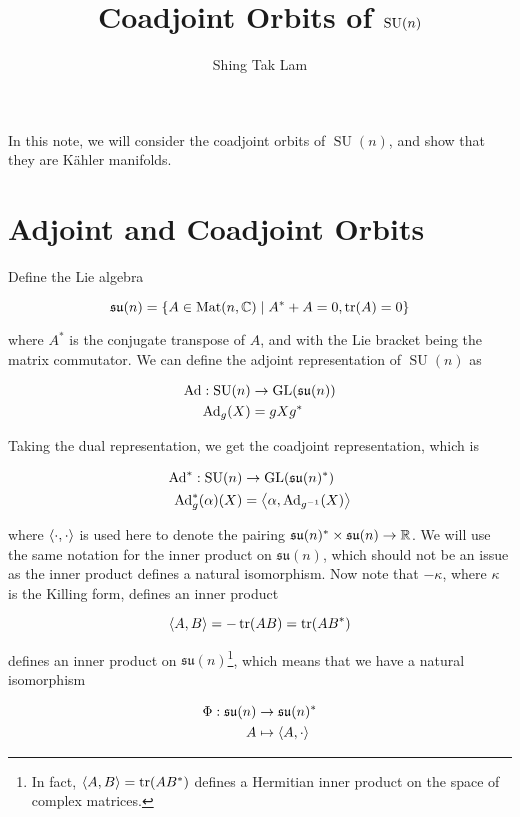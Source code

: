 \documentclass{article}
\title{Coadjoint Orbits of \(\SU(n)\)}
\author{Shing Tak Lam}
\DeclareMathOperator{\SU}{SU}
\newcommand{\su}{\mathfrak{su}}
\begin{document}
\maketitle

In this note, we will consider the coadjoint orbits of \(\SU(n)\), and show that they are K\"ahler manifolds.

\tableofcontents

\section{Adjoint and Coadjoint Orbits}

Define the Lie algebra

\[\su(n) = \left\{A \in \Mat(n, \C) \mid A^* + A = 0, \tr(A) = 0\right\}\]

where \(A^*\) is the conjugate transpose of \(A\), and with the Lie bracket being the matrix commutator. We can define the adjoint representation of \(\SU(n)\) as

\begin{align*}
    \Ad : \SU(n) &\to \GL(\su(n)) \\
    \Ad_g(X) &= gXg^*
\end{align*}

Taking the dual representation, we get the coadjoint representation, which is

\begin{align*}
    \Ad^* : \SU(n) &\to \GL(\su(n)^*) \\
    \Ad^*_g(\alpha)(X) &= \inner{\alpha, \Ad_{g^{-1}}(X)}
\end{align*}

where \(\left\langle \cdot, \cdot \right\rangle\) is used here to denote the pairing \(\su(n)^* \times \su(n) \to \R\). We will use the same notation for the inner product on \(\su(n)\), which should not be an issue as the inner product defines a natural isomorphism. Now note that \(-\kappa\), where \(\kappa\) is the Killing form, defines an inner product

\[\left\langle A, B \right\rangle = -\tr(AB) = \tr(AB^*)\]

defines an inner product on \(\su(n)\)\footnote{In fact, \(\left\langle A, B \right\rangle = \tr(AB^*)\) defines a Hermitian inner product on the space of complex matrices.}, which means that we have a natural isomorphism

\begin{align*}
    \Phi : \su(n) &\to \su(n)^* \\
    A &\mapsto \inner{A, \cdot}
\end{align*}
\end{document}
